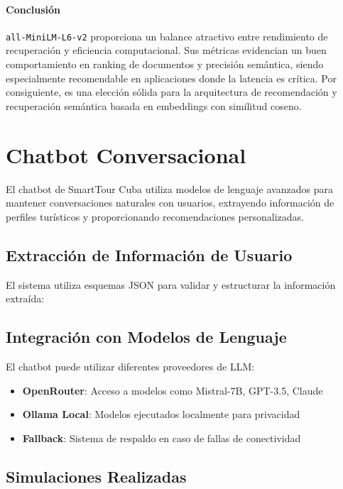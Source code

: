 \documentclass[runningheads]{llncs}
\begin{document}
\paragraph{Conclusión}

\texttt{all‑MiniLM‑L6‑v2} proporciona un balance atractivo entre rendimiento de recuperación y eficiencia computacional. Sus métricas evidencian un buen comportamiento en ranking de documentos y precisión semántica, siendo especialmente recomendable en aplicaciones donde la latencia es crítica. Por consiguiente, es una elección sólida para la arquitectura de recomendación y recuperación semántica basada en embeddings con similitud coseno.


\section{Chatbot Conversacional}


El chatbot de SmartTour Cuba utiliza modelos de lenguaje avanzados para mantener conversaciones naturales con usuarios, extrayendo información de perfiles turísticos y proporcionando recomendaciones personalizadas.


\subsection{Extracción de Información de Usuario}

El sistema utiliza esquemas JSON para validar y estructurar la información extraída:


\subsection{Integración con Modelos de Lenguaje}

El chatbot puede utilizar diferentes proveedores de LLM:

\begin{itemize}
\item \textbf{OpenRouter}: Acceso a modelos como Mistral-7B, GPT-3.5, Claude
\item \textbf{Ollama Local}: Modelos ejecutados localmente para privacidad
\item \textbf{Fallback}: Sistema de respaldo en caso de fallas de conectividad
\end{itemize}

\subsection{Simulaciones Realizadas}
\end{document}
